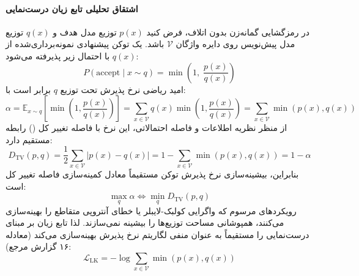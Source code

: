 \paragraph*{اشتقاق تحلیلی تابع زیان درست‌نمایی }
در رمزگشایی گمانه‌زن بدون اتلاف، فرض کنید $p(x)$ توزیع مدل هدف و $q(x)$ توزیع مدل پیش‌نویس روی دایره واژگان $\mathcal{V}$ باشد. یک توکن پیشنهادی نمونه‌برداری‌شده از $q(x)$ با احتمال زیر پذیرفته می‌شود:
\begin{equation}
    P(\text{accept} \mid x \sim q) = \min \left( 1, \; \frac{p(x)}{q(x)} \right)
\end{equation}
امید ریاضی نرخ پذیرش تحت توزیع $q$ برابر است با:
\begin{equation}
    \alpha = \mathbb{E}_{x \sim q}\left[ \min\left( 1, \frac{p(x)}{q(x)} \right) \right] = \sum_{x \in \mathcal{V}} q(x) \min\left( 1, \frac{p(x)}{q(x)} \right) = \sum_{x \in \mathcal{V}} \min(p(x), q(x))
\end{equation}
از منظر نظریه اطلاعات و فاصله احتمالاتی، این نرخ با فاصله تغییر کل () رابطه مستقیم دارد:
\begin{equation}
    D_{\mathrm{TV}}(p, q) = \frac{1}{2} \sum_{x \in \mathcal{V}} |p(x) - q(x)| = 1 - \sum_{x \in \mathcal{V}} \min(p(x), q(x)) = 1 - \alpha
\end{equation}
بنابراین، بیشینه‌سازی نرخ پذیرش توکن مستقیماً معادل کمینه‌سازی فاصله تغییر کل است:
\begin{equation}
    \max_q \alpha \iff \min_q D_{\mathrm{TV}}(p, q)
\end{equation}
رویکردهای مرسوم که واگرایی کولبک-لایبلر یا خطای آنتروپی متقاطع را بهینه‌سازی می‌کنند، همپوشانی مساحت توزیع‌ها را بیشینه نمی‌سازند. لذا  تابع زیان بر مبنای درست‌نمایی  \cite{samarin2026lk} را مستقیماً به عنوان منفی لگاریتم نرخ پذیرش بهینه‌سازی می‌کند (معادله ۱۶ گزارش مرجع):
\begin{equation}
    \mathcal{L}_{\text{LK}} = - \log \sum_{x \in \mathcal{V}} \min(p(x), q(x))
\end{equation}

